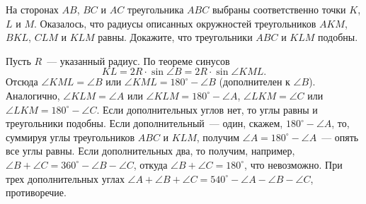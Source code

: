 На сторонах $AB$, $BC$ и $AC$ треугольника $ABC$ выбраны соответственно точки
$K$, $L$ и $M$.
Оказалось, что радиусы описанных окружностей треугольников
$AKM$, $BKL$, $CLM$ и $KLM$ равны.
Докажите, что треугольники $ABC$ и $KLM$ подобны.

\solution
\label{solution:2012/regatta/senior/geomt/1}%
Пусть $R$~--- указанный радиус.
По теореме синусов
\[
    KL = 2 R \cdot \sin \angle B = 2 R \cdot \sin \angle KML
.\]
Отсюда $\angle KML = \angle B$ или $\angle KML = 180^\circ - \angle B$
(дополнителен к $\angle B$).
Аналогично,
$\angle KLM = \angle A$ или $\angle KLM = 180^\circ - \angle A$,
$\angle LKM = \angle C$ или $\angle LKM = 180^\circ - \angle C$.
Если дополнительных углов нет, то углы равны и треугольники подобны.
Если дополнительный~--- один, скажем, $180^\circ - \angle A$, то,
суммируя углы треугольников $ABC$ и $KLM$, получим
$\angle A = 180^\circ - \angle A$~--- опять все углы равны.
Если дополнительных два, то получим, например,
$\angle B + \angle C = 360^\circ - \angle B - \angle C$,
откуда $\angle B + \angle C = 180^\circ$, что невозможно.
При трех дополнительных углах
$\angle A + \angle B + \angle C = 540^\circ - \angle A - \angle B - \angle C$,
противоречие.

